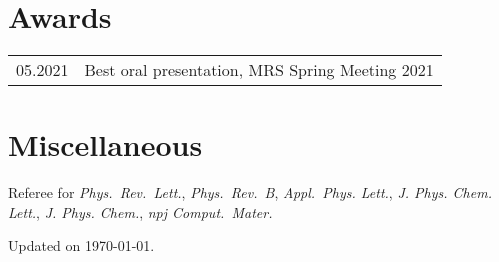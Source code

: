 \documentclass[a4paper, 11pt, DIV=15, headings=normal]{scrartcl}
\begin{document}
\section*{Awards}
\begin{tabular}{ll}
05.2021        & Best oral presentation, MRS Spring Meeting 2021
\end{tabular}

\section*{Miscellaneous}
Referee for \textit{Phys.\ Rev.\ Lett.}, \textit{Phys.\ Rev.\ B}, \textit{Appl.\ Phys. Lett.},
\textit{J. Phys. Chem. Lett.}, \textit{J. Phys. Chem.}, \textit{npj Comput.\ Mater.}


\newrefsegment
\AtNextBibliography{\small}
\nocite{*}
\printbibliography[title={Publications in Chronological Order}]

\bigskip

\begin{minipage}{0.4\linewidth}
\scriptsize Updated on \today.
\end{minipage}
\end{document}
